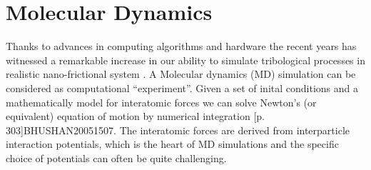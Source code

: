 







\section{Molecular Dynamics}

Thanks to advances in computing algorithms and hardware the recent years has witnessed a remarkable increase in our ability to simulate tribological processes in realistic nano-frictional system \cite{Manini_2016}. A Molecular dynamics (MD) simulation can be considered as computational ``experiment''. Given a set of inital conditions and a mathematically model for interatomic forces we can solve Newton's (or equivalent) equation of motion by numerical integration [p. 303]{BHUSHAN20051507}. The interatomic forces are derived from interparticle interaction potentials, which is the heart of MD simulations and the specific choice of potentials can often be quite challenging.



